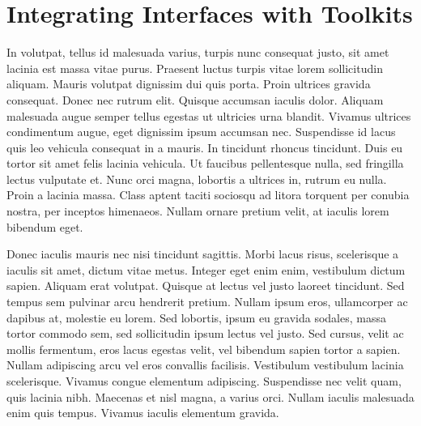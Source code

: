 \chapter{Integrating Interfaces with Toolkits}
In volutpat, tellus id malesuada varius, turpis nunc consequat justo, sit amet lacinia est massa vitae purus. Praesent luctus turpis vitae lorem sollicitudin aliquam. Mauris volutpat dignissim dui quis porta. Proin ultrices gravida consequat. Donec nec rutrum elit. Quisque accumsan iaculis dolor. Aliquam malesuada augue semper tellus egestas ut ultricies urna blandit. Vivamus ultrices condimentum augue, eget dignissim ipsum accumsan nec. Suspendisse id lacus quis leo vehicula consequat in a mauris. In tincidunt rhoncus tincidunt. Duis eu tortor sit amet felis lacinia vehicula. Ut faucibus pellentesque nulla, sed fringilla lectus vulputate et. Nunc orci magna, lobortis a ultrices in, rutrum eu nulla. Proin a lacinia massa. Class aptent taciti sociosqu ad litora torquent per conubia nostra, per inceptos himenaeos. Nullam ornare pretium velit, at iaculis lorem bibendum eget.

Donec iaculis mauris nec nisi tincidunt sagittis. Morbi lacus risus, scelerisque a iaculis sit amet, dictum vitae metus. Integer eget enim enim, vestibulum dictum sapien. Aliquam erat volutpat. Quisque at lectus vel justo laoreet tincidunt. Sed tempus sem pulvinar arcu hendrerit pretium. Nullam ipsum eros, ullamcorper ac dapibus at, molestie eu lorem. Sed lobortis, ipsum eu gravida sodales, massa tortor commodo sem, sed sollicitudin ipsum lectus vel justo. Sed cursus, velit ac mollis fermentum, eros lacus egestas velit, vel bibendum sapien tortor a sapien. Nullam adipiscing arcu vel eros convallis facilisis. Vestibulum vestibulum lacinia scelerisque. Vivamus congue elementum adipiscing. Suspendisse nec velit quam, quis lacinia nibh. Maecenas et nisl magna, a varius orci. Nullam iaculis malesuada enim quis tempus. Vivamus iaculis elementum gravida.